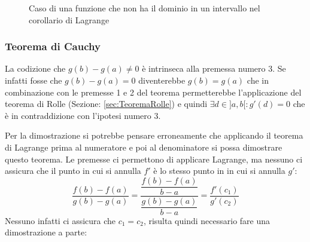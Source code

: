 \begin{figure}[h]
\centering
{}
	\caption{Caso di una funzione che non ha il dominio in un intervallo nel corollario di Lagrange}
	\label{fig:EsempioCorollarioLagrange}
\end{figure}


\subsubsection{Teorema di Cauchy} \label{sec:TeoremaCauchy}
\thm {
Date due funzioni $f,g:[a,b] \to \mathbb{R}$ con le seguenti proprietà:
\begin{enumerate}
    \item $f,g$ è continue su $[a,b]$
    \item $f,g$ è derivabili su $]a,b[$
    \item $g'(x) \neq 0 \quad \forall x\in ]a,b[$
\end{enumerate}
Allora:
\begin{equation*}
    \exists \,c \in ]a,b[ \;: \dfrac{f(b)-f(a)}{g(b)-g(a)} = \dfrac{f'(c)}{g'(c)}
\end{equation*}
}
La codizione che $g(b) - g(a) \neq 0$ è intrinseca alla premessa numero 3. Se infatti fosse che $g(b) - g(a) = 0$ diventerebbe $g(b) = g(a)$ che in combinazione con le premesse 1 e 2 del teorema permetterebbe l'applicazione del teorema di Rolle (Sezione: \ref{sec:TeoremaRolle}) e quindi $\exists d \in ]a,b[ : g'(d) = 0$ che è in contraddizione con l'ipotesi numero 3.

Per la dimostrazione si potrebbe pensare erroneamente che applicando il teorema di Lagrange prima al numeratore e poi al denominatore si possa dimostrare questo teorema. Le premesse ci permettono di applicare Lagrange, ma nessuno ci assicura che il punto in cui si annulla $f'$ è lo stesso punto in in cui si annulla $g'$:
\begin{equation*}
	\dfrac{f(b) - f(a)}{g(b) - g(a)} = \dfrac{\dfrac{f(b) - f(a)}{b-a}}{\dfrac{g(b)-g(a)}{b - a}} = \dfrac{f'(c_1)}{g'(c_2)}
\end{equation*}
Nessuno infatti ci assicura che $c_1 = c_2$, risulta quindi necessario fare una dimostrazione a parte:

